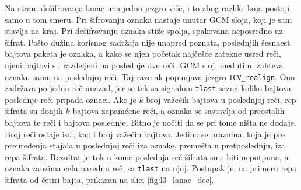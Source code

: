 Na strani dešifrovanja lanac ima jedno jezgro više, i to zbog razlike koja postoji samo u tom smeru. Pri šifrovanju oznaka nastaje unutar GCM sloja, koji je sam stavlja na kraj. Pri dešifrovanju oznaka stiže spolja, spakovana neposredno uz šifrat. Pošto dužina korisnog sadržaja nije unapred poznata, poslednjih šesnaest bajtova paketa je oznaka, a kako se njen početak najčešće zatekne usred reči, njeni bajtovi su razdeljeni na poslednje dve reči. GCM sloj, međutim, zahteva oznaku samu na poslednjoj reči.
\smallbreak
Taj razmak popunjava jezgro \texttt{ICV\_realign}. Ono zadržava po jednu reč unazad, jer se tek sa signalom \texttt{tlast} sazna koliko bajtova poslednje reči pripada oznaci. Ako je $k$ broj važećih bajtova u poslednjoj reči, rep šifrata su donjih $k$ bajtova zapamćene reči, a oznaka se sastavlja od preostalih bajtova te reči i bajtova poslednje.
\smallbreak
Bitno je uočiti da se pri tome ništa ne dodaje. Broj reči ostaje isti, kao i broj važećih bajtova. Jedino se praznina, koja je pre preuređenja stajala u poslednjoj reči iza oznake, premešta u pretposlednju, iza repa šifrata. Rezultat je tok u kome poslednja reč šifrata sme biti nepotpuna, a oznaka zauzima celu narednu reč, sa \texttt{tlast} na njoj. Postupak je, na primeru repa šifrata od četiri bajta, prikazan na slici \ref{fig:l3_lanac_dec}.

